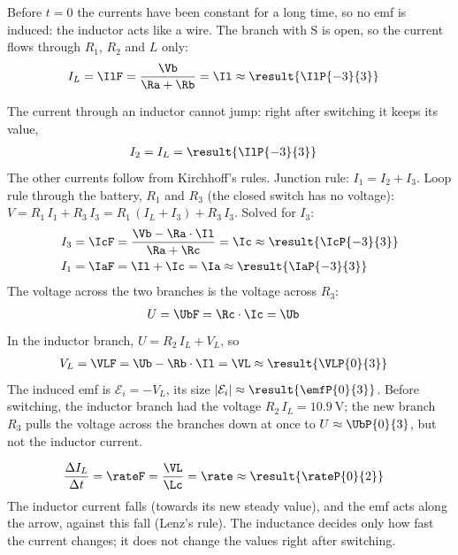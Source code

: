 \begin{abcliste}
\abc Before $t = 0$ the currents have been constant for a long time, so no emf is induced: the inductor acts like a wire. The branch with S is open, so the current flows through $R_1$, $R_2$ and $L$ only:
\begin{align}
 I_L &= \IlF = \frac{\Vb}{\Ra+\Rb} = \Il \approx \result{\IlP{-3}{3}}
\end{align}

\abc The current through an inductor cannot jump: right after switching it keeps its value,
\begin{align}
 I_2 &= I_L = \result{\IlP{-3}{3}}
\end{align}
The other currents follow from Kirchhoff's rules. Junction rule: $I_1 = I_2 + I_3$. Loop rule through the battery, $R_1$ and $R_3$ (the closed switch has no voltage): $V = R_1\,I_1 + R_3\,I_3 = R_1\,(I_L + I_3) + R_3\,I_3$. Solved for $I_3$:
\begin{align}
 I_3 &= \IcF = \frac{\Vb-\Ra\cdot\Il}{\Ra+\Rc} = \Ic \approx \result{\IcP{-3}{3}} \\
 I_1 &= \IaF = \Il+\Ic = \Ia \approx \result{\IaP{-3}{3}}
\end{align}
The voltage across the two branches is the voltage across $R_3$:
\begin{align}
 U &= \UbF = \Rc\cdot\Ic = \Ub
\end{align}
In the inductor branch, $U = R_2\,I_L + V_L$, so
\begin{align}
 V_L &= \VLF = \Ub-\Rb\cdot\Il = \VL \approx \result{\VLP{0}{3}}
\end{align}
The induced emf is $\mathcal{E}_i = -V_L$, its size $|\mathcal{E}_i| \approx \result{\emfP{0}{3}}$. Before switching, the inductor branch had the voltage $R_2\,I_L = \SI{10.9}{\V}$; the new branch $R_3$ pulls the voltage across the branches down at once to $U \approx \UbP{0}{3}$, but not the inductor current.

\abc
\begin{align}
 \frac{\Delta I_L}{\Delta t} &= \rateF = \frac{\VL}{\Lc} = \rate \approx \result{\rateP{0}{2}}
\end{align}
The inductor current falls (towards its new steady value), and the emf acts along the arrow, against this fall (Lenz's rule). The inductance decides only how fast the current changes; it does not change the values right after switching.
\end{abcliste}
